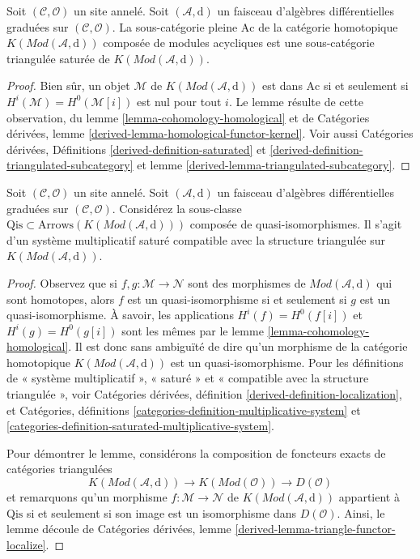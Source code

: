 \begin{lemma}
\label{lemma-acyclics}
Soit $(\mathcal{C}, \mathcal{O})$ un site annelé.
Soit $(\mathcal{A}, \text{d})$ un faisceau d'algèbres différentielles graduées sur $(\mathcal{C}, \mathcal{O})$.
La sous-catégorie pleine $\text{Ac}$ de la catégorie homotopique $K(\textit{Mod}(\mathcal{A}, \text{d}))$ composée de modules acycliques est une sous-catégorie triangulée saturée de $K(\textit{Mod}(\mathcal{A}, \text{d}))$.
\end{lemma}

\begin{proof}
Bien sûr, un objet $\mathcal{M}$ de $K(\textit{Mod}(\mathcal{A}, \text{d}))$ est dans $\text{Ac}$ si et seulement si $H^i(\mathcal{M}) = H^0(\mathcal{M}[i])$ est nul pour tout $i$.
Le lemme résulte de cette observation, du lemme \ref{lemma-cohomology-homological} et de Catégories dérivées, lemme \ref{derived-lemma-homological-functor-kernel}.
Voir aussi Catégories dérivées, Définitions \ref{derived-definition-saturated}  et \ref{derived-definition-triangulated-subcategory}  et lemme \ref{derived-lemma-triangulated-subcategory}.
\end{proof}

\begin{lemma}
\label{lemma-qis}
Soit $(\mathcal{C}, \mathcal{O})$ un site annelé.
Soit $(\mathcal{A}, \text{d})$ un faisceau d'algèbres différentielles graduées sur $(\mathcal{C}, \mathcal{O})$.
Considérez la sous-classe $\text{Qis} \subset \text{Arrows}(K(\textit{Mod}(\mathcal{A}, \text{d})))$ composée de quasi-isomorphismes.
Il s'agit d'un système multiplicatif saturé compatible avec la structure triangulée sur $K(\textit{Mod}(\mathcal{A}, \text{d}))$.
\end{lemma}

\begin{proof}
Observez que si $f , g : \mathcal{M} \to \mathcal{N}$ sont des morphismes de $\textit{Mod}(\mathcal{A}, \text{d})$ qui sont homotopes, alors $f$ est un quasi-isomorphisme si et seulement si $g$ est un quasi-isomorphisme.
À savoir, les applications $H^i(f) = H^0(f[i])$ et $H^i(g) = H^0(g[i])$ sont les mêmes par le lemme \ref{lemma-cohomology-homological}.
Il est donc sans ambiguïté de dire qu'un morphisme de la catégorie homotopique $K(\textit{Mod}(\mathcal{A}, \text{d}))$ est un quasi-isomorphisme.
Pour les définitions de « système multiplicatif », « saturé » et « compatible avec la structure triangulée », voir Catégories dérivées, définition \ref{derived-definition-localization}, et Catégories, définitions \ref{categories-definition-multiplicative-system} et \ref{categories-definition-saturated-multiplicative-system}.

\medskip\noindent
Pour démontrer le lemme, considérons la composition de foncteurs exacts de catégories triangulées
$$
K(\textit{Mod}(\mathcal{A}, \text{d}))
\longrightarrow
K(\textit{Mod}(\mathcal{O}))
\longrightarrow
D(\mathcal{O})
$$
et remarquons qu'un morphisme $f : \mathcal{M} \to \mathcal{N}$ de $K(\textit{Mod}(\mathcal{A}, \text{d}))$ appartient à $\text{Qis}$ si et seulement si son image est un isomorphisme dans $D(\mathcal{O})$.
Ainsi, le lemme découle de Catégories dérivées, lemme \ref{derived-lemma-triangle-functor-localize}.
\end{proof}

